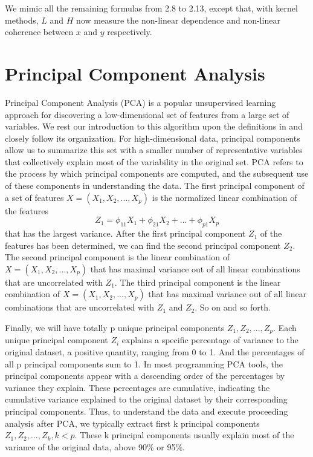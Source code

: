 \documentclass[12pt]{report} %
\begin{document}
We mimic all the remaining formulas from 2.8 to 2.13, except that, with kernel methods, $L$ and $H$ now measure the non-linear dependence and non-linear coherence between $x$ and $y$ respectively.

\section{Principal Component Analysis}
Principal Component Analysis (PCA) is a popular unsupervised learning approach for discovering a low-dimensional set of features from a large set of variables. We rest our introduction to this algorithm upon the definitions in \cite{STAT} and closely follow its organization. For high-dimensional data, principal components allow us to summarize this set with a smaller number of representative variables that collectively explain most of the variability in the original set. PCA refers to the process by which principal components are computed, and the subsequent use of these components in understanding the data. The first principal component of a set of features \(X = (X_{1}, X_{2},..., X_{p})\) is the normalized linear combination of the features
\begin{equation}
Z_{1} = \phi_{11}X_{1} + \phi_{21}X_{2} +...+ \phi_{p1}X_{p}
\end{equation}
that has the largest variance. After the first principal component \(Z_{1}\) of the features has been determined, we can find the second principal component \(Z_{2}\). The second principal component is the linear combination of \(X = (X_{1}, X_{2},..., X_{p})\) that has maximal variance out of all linear combinations that are uncorrelated with \(Z_{1}\). The third principal component is the linear combination of \(X = (X_{1}, X_{2},..., X_{p})\) that has maximal variance out of all linear combinations that are uncorrelated with \(Z_{1}\) and \(Z_{2}\). So on and so forth. 

Finally, we will have totally p unique principal components \(Z_{1}, Z_{2},..., Z_{p}\). Each unique principal component \(Z_{i}\) explains a specific percentage of variance to the original dataset, a positive quantity, ranging from 0 to 1. And the percentages of all p principal components sum to 1. In most programming PCA tools, the principal components appear with a descending order of the percentages by variance they explain. These percentages are cumulative, indicating the cumulative variance explained to the original dataset by their corresponding principal components. Thus, to understand the data and execute proceeding analysis after PCA, we typically extract first k principal components \(Z_{1}, Z_{2},..., Z_{k}, k <p \). These k principal components usually explain most of the variance of the original data, above 90\% or 95\%.
\end{document}
